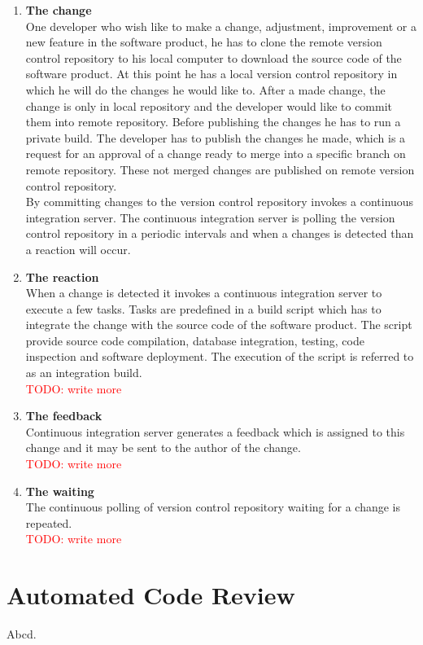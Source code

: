\begin{enumerate}
	\item \textbf{The change}\\
		  One developer who wish like to make a change, adjustment, improvement or a new feature in the software product, he has to clone the remote version control repository to his local computer to download the source code of the software product. At this point he has a local version control repository in which he will do the changes he would like to. After a made change, the change is only in local repository and the developer would like to commit them into remote repository. Before publishing the changes he has to run a private build. The developer has to publish the changes he made, which is a request for an approval of a change ready to merge into a specific branch on remote repository. These not merged changes are published on remote version control repository.\\
		  By committing changes to the version control repository invokes a continuous integration server. The continuous integration server is polling the version control repository in a periodic intervals and when a changes is detected than a reaction will occur.
	\item \textbf{The reaction}\\
		  When a change is detected it invokes a continuous integration server to execute a few tasks. Tasks are predefined in a build script which has to integrate the change with the source code of the software product. The script provide source code compilation, database integration, testing, code inspection and software deployment. The execution of the script is referred to as an integration build.\\
		  \textcolor{red}{TODO: write more}
	\item \textbf{The feedback}\\
		  Continuous integration server generates a feedback which is assigned to this change and it may be sent to the author of the change.\\
		  \textcolor{red}{TODO: write more}
	\item \textbf{The waiting}\\
		  The continuous polling of version control repository waiting for a change is repeated.\\
		  \textcolor{red}{TODO: write more}
\end{enumerate}



\section{Automated Code Review}
Abcd.

